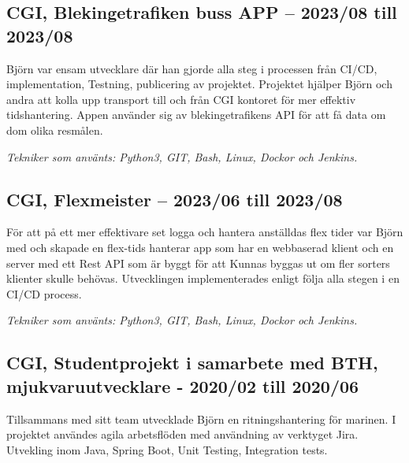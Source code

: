 \documentclass{article}
\begin{document}
\begin{minipage}[t]{0.7\textwidth}
	
	
  \vspace{15pt} %
  \subsection*{\textcolor{colorTitelErfarenhet}{CGI, Blekingetrafiken buss APP – 2023/08 till 2023/08}}
  Björn var ensam utvecklare där han gjorde alla steg i processen från CI/CD, implementation, 
  Testning, publicering av projektet. Projektet hjälper Björn och andra att kolla upp transport 
  till och från CGI kontoret för mer effektiv tidshantering. Appen använder sig av blekingetrafikens 
  API för att få data om dom olika resmålen.
  
  \vspace{5pt}\textit{Tekniker som använts: Python3, GIT, Bash, Linux, Dockor och Jenkins.}
  
  \vspace{15pt} %
  
  \subsection*{\textcolor{colorTitelErfarenhet}{CGI, Flexmeister – 2023/06 till 2023/08}}
  För att på ett mer effektivare set logga och hantera anställdas flex tider var Björn med och 
  skapade en flex-tids hanterar app som har en webbaserad klient och en server med ett Rest API som är 
  byggt för att Kunnas byggas ut om fler sorters klienter skulle behövas. Utvecklingen implementerades 
  enligt följa alla stegen i en CI/CD process.

  \vspace{5pt}\textit{Tekniker som använts: Python3, GIT, Bash, Linux, Dockor och Jenkins.}

  \vspace{15pt} %
  \subsection*{\textcolor{colorTitelErfarenhet}{CGI, Studentprojekt i samarbete med BTH, mjukvaruutvecklare - 2020/02 till 2020/06}}
  Tillsammans med sitt team utvecklade Björn en ritningshantering för marinen. 
  I projektet användes agila arbetsflöden med användning av verktyget Jira. 
  Utvekling inom Java, Spring Boot, Unit Testing, Integration tests.
  

\end{minipage}
\end{document}
